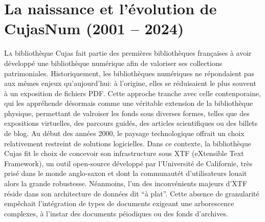 \chapter{La naissance et l’évolution de CujasNum (2001 – 2024)}

\lettrine{L}a bibliothèque Cujas fait partie des premières bibliothèques françaises à avoir développé une bibliothèque numérique afin de valoriser ses collections patrimoniales. Historiquement, les bibliothèques numériques ne répondaient pas aux mêmes enjeux qu'aujourd'hui: à l'origine, elles se réduisaient le plus souvent à un exposition de fichiers PDF. Cette approche tranche avec celle contenporaine, qui les appréhende désormais comme une véritable extension de la bibliothèque physique, permettant de valroiser les fonds sous diverses formes, telles que des expositions virtuelles, des parcours guidés, des articles scientifiques ou des billets de blog. Au début des années 2000, le paysage technologique offrait un choix relativement restreint de solutions logicielles. Dans ce contexte, la bibliothèque Cujas fit le choix de concevoir son infrastructure sous XTF (eXtensible Text Framework), un outil open-source développé par l'Université de Californie, très prisé dans le monde anglo-saxon et dont la communautét d'utilisateurs louait alors la grande robustesse. Néanmoins, l'un des inconvénients majeurs d'XTF réside dans son architecture de données dit \enquote{à plat}. Cette absence de granularité empêchait l'intégration de types de documents exigeant une arborescence complexes, à l'instar des documents péiodiques ou des fonds d'archives.




